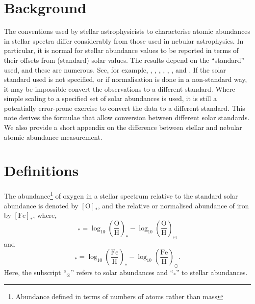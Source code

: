 \section{Background}

The conventions used by stellar astrophysicists to characterise atomic abundances in stellar spectra differ considerably from those used in nebular astrophysics.  In particular, it is normal for stellar abundance values to be reported in terms of their offsets from (standard) solar values. The results depend on the ``standard'' used, and these are numerous. See, for example, \cite{1989GeCoA..53..197A}, \cite{1998SSRv...85..161G}, \cite{2007SSRv..130..105G}, \cite{2009ARA&A..47..481A}, \cite{2010Ap&SS.328..179G}, \cite{2015A&A...573A..25S}, \cite{2015A&A...573A..26S} and \cite{2015A&A...573A..27G}.  If the solar standard used is not specified, or if normalisation is done in a non-standard way, it may be impossible convert the observations to a different standard. Where simple scaling to a specified set of solar abundances is used, it is still a potentially error-prone exercise to convert the data to a different standard. This note derives the formulae that allow conversion between different solar standards. We also provide a short appendix on the difference between stellar and nebular atomic abundance measurement.
  
\section{Definitions}
The abundance\footnote{Abundance defined in terms of numbers of atoms rather than mass} of oxygen in a stellar spectrum relative to the standard solar abundance is denoted by $[\text{O}]_*$, and the relative or normalised abundance of iron by $[\text{Fe}]_*$, where,
\begin{equation}
[\text{O}]_* = \log_{10}\left(\frac{\text{O}}{\text{H}}\right)_* - \log_{10}\left(\frac{\text{O}}{\text{H}}\right)_\odot
\end{equation}
and
\begin{equation}
[\text{Fe}]_* = \log_{10}\left(\frac{\text{Fe}}{\text{H}}\right)_* - \log_{10}\left(\frac{\text{Fe}}{\text{H}}\right)_\odot .
\end{equation}
Here, the subscript ``$_\odot$'' refers to solar abundances and ``$_*$'' to stellar abundances.

